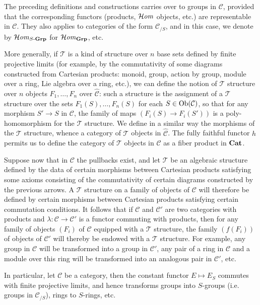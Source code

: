 The preceding definitions and constructions carries over to groups in $\mathcal{C}$, provided that the corresponding functors (products, $\operatorname{\mathcal{H}\hspace*{-0.4pt}\textit{om}\hspace{0.5pt}}$ objects, etc.) are representable in $\mathcal{C}$. They also applies to categories of the form $\mathcal{C}_{/S}$, and in this case, we denote by $\operatorname{\mathcal{H}\hspace*{-0.4pt}\textit{om}\hspace{0.5pt}}_{S\textup{-}\mathbf{Grp}}$ for $\operatorname{\mathcal{H}\hspace*{-0.4pt}\textit{om}\hspace{0.5pt}}_{\mathbf{Grp}}$, etc.\par
More generally, if $\mathcal{T}$ is a kind of structure over $n$ base sets defined by finite projective limits (for example, by the commutativity of some diagrams constructed from Cartesian products: monoid, group, action by group, module over a ring, Lie algebra over a ring, etc.), we can define the notion of $\mathcal{T}$ structure over $n$ objects $F_1,\dots,F_n$ over $\widehat{\mathcal{C}}$: such a structure is the assignment of a $\mathcal{T}$ structure over the sets $F_1(S),\dots,F_n(S)$ for each $S\in\mathrm{Ob}(\mathcal{C})$, so that for any morphism $S'\to S$ in $\mathcal{C}$, the family of maps $(F_i(S)\to F_i(S'))$ is a poly-homomorphism for the $\mathcal{T}$ structure. We define in a similar way the morphisms of the $\mathcal{T}$ structure, whence a category of $\mathcal{T}$ objects in $\widehat{\mathcal{C}}$. The fully faithful functor $h$ permits us to define the category of $\mathcal{T}$ objects in $\mathcal{C}$ as a fiber product in $\mathbf{Cat}$.\par
Suppose now that in $\mathcal{C}$ the pullbacks exist, and let $\mathcal{T}$ be an algebraic structure defined by the data of certain morphisms between Cartesian products satisfying some axioms consisting of the commutativity of certain diagrams constructed by the previous arrows. A $\mathcal{T}$ structure on a family of objects of $\mathcal{C}$ will therefore be defined by certain morphisms between Cartesian products satisfying certain commutation conditions. It follows that if $\mathcal{C}$ and $\mathcal{C}'$ are two categories with products and $\lambda:\mathcal{C}\to\mathcal{C}'$ is a functor commuting with products, then for any family of objects $(F_i)$ of $\mathcal{C}$ equipped with a $\mathcal{T}$ structure, the family $(f(F_i))$ of objects of $\mathcal{C}'$ will thereby be endowed with a $\mathcal{T}$ structure. For example, any group in $\mathcal{C}$ will be transformed into a group in $\mathcal{C}'$, any pair of a ring in $\mathcal{C}$ and a module over this ring will be transformed into an analogous pair in $\mathcal{C}'$, etc.\par
In particular, let $\mathcal{C}$ be a category, then the constant functor $E\mapsto E_S$ commutes with finite projective limits, and hence transforms groups into $S$-groups (i.e. groups in $\mathcal{C}_{/S}$), rings to $S$-rings, etc.

